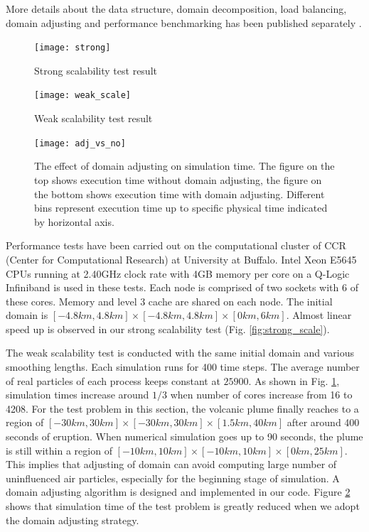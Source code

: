 \documentclass[gmd, manuscript]{copernicus}
\begin{document}
More details about the data structure, domain decomposition, load balancing, domain adjusting and performance benchmarking has been published separately \citep{cao2017data}.

\begin{figure}[!htb]
    \centering
    \begin{minipage}{.425\textwidth}
		\centering
		\texttt{[image: strong]}
		\caption{Strong scalability test result}
		\label{fig:strong_scale}
    \end{minipage}%
    \begin{minipage}{.425 \textwidth}
		\centering
		\texttt{[image: weak\_scale]}
		\caption{Weak scalability test result}
		\label{fig:weak_scale}
    \end{minipage}%
\end{figure}

\begin{figure}[!t]
\centering
\texttt{[image: adj\_vs\_no]}
\caption{The effect of domain adjusting on simulation time. The figure on the top shows execution time without domain adjusting, the figure on the bottom shows execution time with domain adjusting. Different bins represent execution time up to specific physical time indicated by horizontal axis.}
\label{fig:adj_vs_no}
\end{figure}

Performance tests have been carried out on the computational cluster of CCR (Center for Computational Research) at University at Buffalo. Intel Xeon E5645 CPUs running at 2.40GHz clock rate with 4GB memory per core on a Q-Logic Infiniband is used in these tests. Each node is comprised of two sockets with 6 of these cores. Memory and level 3 cache are shared on each node. The initial domain is $[-4.8km, 4.8km] \times [-4.8km,4.8km] \times [0km, 6km]$. Almost linear speed up is observed in our strong scalability test (Fig. \ref{fig:strong_scale}).

The weak scalability test is conducted with the same initial domain and various smoothing lengths. Each simulation runs for 400 time steps. The average number of real particles of each process keeps constant at $25900$. As shown in Fig. \ref{fig:weak_scale}, simulation times increase around $1/3$ when number of cores increase from 16 to 4208. For the test problem in this section, the volcanic plume finally reaches to a region of $[-30km , 30km] \times [-30km, 30km] \times [1.5km, 40km]$ after around 400 seconds of eruption. When numerical simulation goes up to 90 seconds, the plume is still within a region of $[-10km, 10km] \times [-10km, 10km] \times [0km,25km]$. This implies that adjusting of domain can avoid computing large number of uninfluenced air particles, especially for the beginning stage of simulation. A domain adjusting algorithm \citep{cao2017data} is designed and implemented in our code. Figure \ref{fig:adj_vs_no} shows that simulation time of the test problem is greatly reduced when we adopt the domain adjusting strategy.
\end{document}
